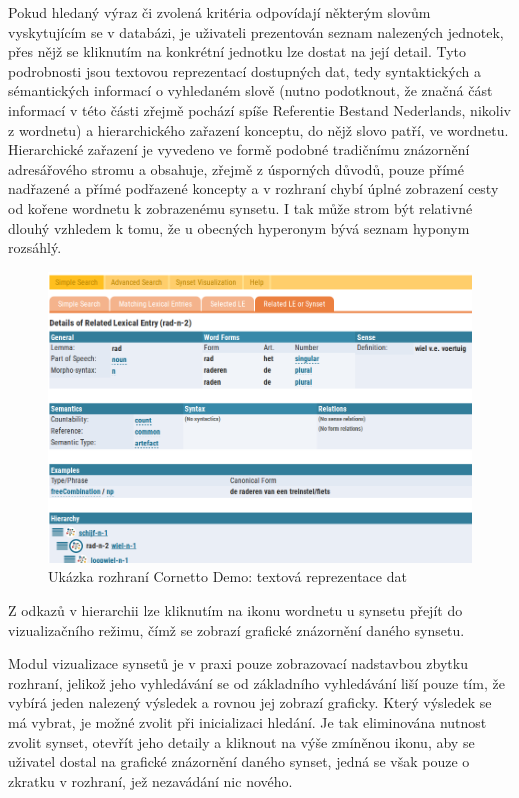 \documentclass[a4paper, 11pt, oneside]{book}
\begin{document}
				Pokud hledaný výraz či zvolená kritéria odpovídají některým slovům vyskytujícím se v databázi, je uživateli prezentován seznam nalezených jednotek, přes nějž se kliknutím na konkrétní jednotku lze dostat na její detail. Tyto podrobnosti jsou textovou reprezentací dostupných dat, tedy syntaktických a sémantických informací o vyhledaném slově (nutno podotknout, že značná část informací v této části zřejmě pochází spíše Referentie Bestand Nederlands, nikoliv z wordnetu) a hierarchického zařazení konceptu, do nějž slovo patří, ve wordnetu. Hierarchické zařazení je vyvedeno ve formě podobné tradičnímu znázornění adresářového stromu a obsahuje, zřejmě z úsporných důvodů, pouze přímé nadřazené a přímé podřazené koncepty a v rozhraní chybí úplné zobrazení cesty od kořene wordnetu k zobrazenému synsetu. I tak může strom být relativné dlouhý vzhledem k tomu, že u obecných hyperonym bývá seznam hyponym rozsáhlý. 

				\begin{figure}[h]
					\centering
					\includegraphics[width=1.0\textwidth]{cornetto-text1.png}
					\caption{Ukázka rozhraní Cornetto Demo: textová reprezentace dat}
					\label{fig:cornetto-text1}
				\end{figure}

				Z odkazů v hierarchii lze kliknutím na ikonu wordnetu u synsetu přejít do vizualizačního režimu, čímž se zobrazí grafické znázornění daného synsetu. 

				Modul vizualizace synsetů je v praxi pouze zobrazovací nadstavbou zbytku rozhraní, jelikož jeho vyhledávání se od základního vyhledávání liší pouze tím, že vybírá jeden nalezený výsledek a rovnou jej zobrazí graficky. Který výsledek se má vybrat, je možné zvolit při inicializaci hledání. Je tak eliminována nutnost zvolit synset, otevřít jeho detaily a kliknout na výše zmíněnou ikonu, aby se uživatel dostal na grafické znázornění daného synset, jedná se však pouze o zkratku v rozhraní, jež nezavádání nic nového.
\end{document}
